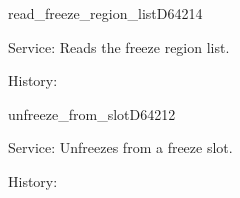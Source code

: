 \begin{hyppotrap}{read\_freeze\_region\_list}{D642}{14}
\item [Service:]
  Reads the freeze region list.
\item [History:]
\end{hyppotrap}


\begin{hyppotrap}{unfreeze\_from\_slot}{D642}{12}
\item [Service:]
  Unfreezes from a freeze slot.
\item [History:]
\end{hyppotrap}


